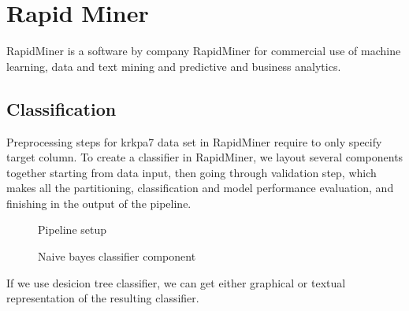 \documentclass[11pt]{article}
\begin{document}
\clearpage
\section{Rapid Miner}
RapidMiner is a software by company RapidMiner for commercial use of machine learning, data and text mining and predictive and business analytics.

\subsection{Classification}
Preprocessing steps for krkpa7 data set in RapidMiner require to only specify
target column.  To create a classifier in RapidMiner, we layout several
components together starting from data input, then going through validation
step, which makes all the partitioning, classification and model performance
evaluation, and finishing in the output of the pipeline.

\begin{figure}[!ht]
	\centering
    \caption{Pipeline setup}
\end{figure}

\begin{figure}[!ht]
	\centering
    \caption{Naive bayes classifier component}
\end{figure}

If we use desicion tree classifier, we can get either graphical or textual representation of the resulting classifier.
\end{document}

